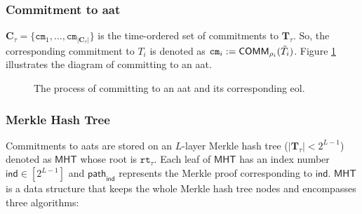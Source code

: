 \subsubsection{Commitment to \gls{aat}}
$\mathbf{C}_\tau = \{\texttt{cm}_1, \dots, \texttt{cm}_{|\mathbf{C}_\tau|}\}$ is the time-ordered set of commitments to $\mathbf{T}_\tau$. So, the corresponding commitment to  $T_i$ is denoted as $\texttt{cm}_i := \mathsf{COMM}_{\rho_i}(\Tilde{T_i})$. Figure \ref{fig:zupply-token} illustrates the diagram of committing to an \gls{aat}.




\begin{figure}
	\centering
	
	\caption[Commitment to an Anonymous Authenticated Token]{The process of committing to an \gls{aat} and its corresponding \gls{eol}.}
	\label{fig:zupply-token}
\end{figure}


\subsubsection{Merkle Hash Tree}
Commitments to \gls{aat}s are stored on an $L$-layer Merkle hash tree ($|\mathbf{T}_\tau|<2^{L-1}$) denoted as $\mathsf{MHT}$ whose root is $\texttt{rt}_\tau$.
Each leaf of $\mathsf{MHT}$ has an index number $ \mathsf{ind}\in [2^{L-1}]$ and $\mathsf{path}_\mathsf{ind}$ represents the Merkle proof corresponding to $\mathsf{ind}$. %
$\mathsf{MHT}$ is a data structure that keeps the whole Merkle hash tree nodes and encompasses three algorithms: 

